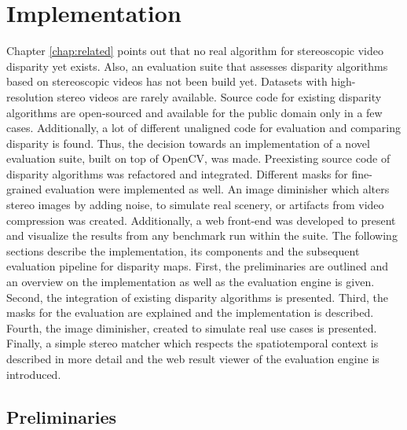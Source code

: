 \chapter{Implementation}
\label{chap:impl}

Chapter \ref{chap:related} points out that no real algorithm for stereoscopic video disparity yet exists.
Also, an evaluation suite that assesses disparity algorithms based on stereoscopic videos has not been build yet.
Datasets with high-resolution stereo videos are rarely available.
Source code for existing disparity algorithms are open-sourced and available for the public domain only in a few cases.
Additionally, a lot of different unaligned code for evaluation and comparing disparity is found.
Thus, the decision towards an implementation of a novel evaluation suite, built on top of OpenCV, was made.
Preexisting source code of disparity algorithms was refactored and integrated.
Different masks for fine-grained evaluation were implemented as well.
An image diminisher which alters stereo images by adding noise, to simulate real scenery, or artifacts from video compression was created.
Additionally, a web front-end was developed to present and visualize the results from any benchmark run within the suite.
\newline\newline\noindent The following sections describe the implementation, its components and the subsequent evaluation pipeline for disparity maps.
First, the preliminaries are outlined and an overview on the implementation as well as the evaluation engine is given.
Second, the integration of existing disparity algorithms is presented.
Third, the masks for the evaluation are explained and the implementation is described.
Fourth, the image diminisher, created to simulate real use cases is presented.
Finally, a simple stereo matcher which respects the spatiotemporal context is described in more detail and the web result viewer of the evaluation engine is introduced.

\section{Preliminaries}

